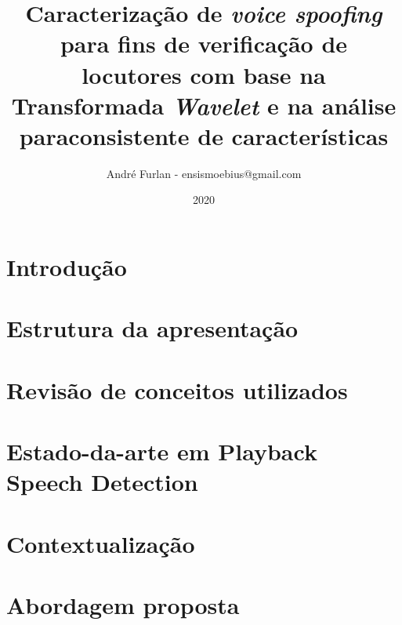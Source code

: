 

\title{Caracterização de \textit{voice spoofing} para fins de verificação de locutores com base na Transformada \textit{Wavelet} e na análise paraconsistente de características}


\author{André Furlan - ensismoebius@gmail.com}

\date{2020}


	
	\frame{\titlepage}
	
	\section{Introdução}
		

	\section{Estrutura da apresentação}
		

	\section{Revisão de conceitos utilizados}
		
		
		
		
		
		
		
	
	\section{Estado-da-arte em Playback Speech Detection}
		
		
	\section{Contextualização}
		

	\section{Abordagem proposta}
		
		
		
		
